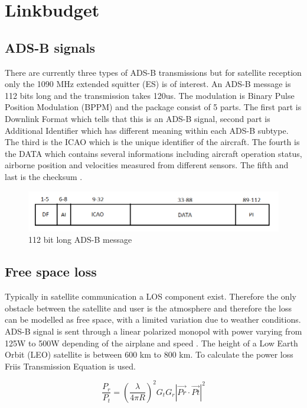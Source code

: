 \chapter{Linkbudget}\label{ch:linkbudget}

\section{ADS-B signals}
There are currently three types of ADS-B transmissions but for satellite reception only the 1090 MHz extended squitter (ES) is of interest.  
An ADS-B message is 112 bits long and the transmission takes 120us. The modulation is Binary Pulse Position Modulation (BPPM) and the package consist of 5 parts. The first part is Downlink Format which tells that this is an ADS-B signal, second part is Additional Identifier which has different meaning within each ADS-B subtype. The third is the ICAO which is the unique identifier of the aircraft. The fourth is the DATA which contains several informations including aircraft operation status, airborne position and velocities measured from different sensors. The fifth and last is the checksum \citep{Modesorg}.      

\begin{figure}[h]
\centering 
\includegraphics[scale = 0.5]{figures/adsb_signals/adsb_message.png}
\caption{112 bit long ADS-B message}
\label{fig:adsb_mes}
\end{figure}

\section{Free space loss}

Typically in satellite communication a LOS component exist. Therefore the only obstacle between the satellite and user is the atmosphere and therefore the loss can be modelled as free space, with a limited variation due to weather conditions. ADS-B signal is sent through a linear polarized monopol with power varying from 125W to 500W depending of the airplane and speed \citep{FlyingLab}. The height of a Low Earth Orbit (LEO) satellite is between 600 km to 800 km. To calculate the power loss Friis Transmission Equation is used. 

\begin{equation}
\frac{P_r}{P_t} = (\frac{\lambda}{4\pi R})^2 G_t G_r|\vec{Pr}\cdot \vec{Pt}|^2
\end{equation}

